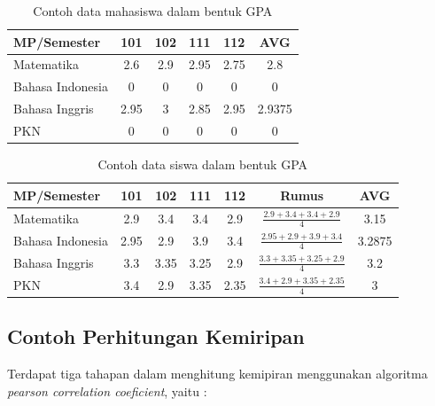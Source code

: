 \begin{table}[H]
    \centering
    \renewcommand{\arraystretch}{1.5}
    \begin{tabular}{|l|c|c|c|c|c|}
        \hline
        MP\slash Semester & 101 & 102 & 111 & 112 & AVG \\
        \hline 
        Matematika & 2.6 & 2.9 & 2.95 & 2.75 & 2.8 \\
        \hline 
        Bahasa Indonesia & 0 & 0 & 0 & 0 & 0 \\
        \hline 
        Bahasa Inggris & 2.95 & 3 & 2.85 & 2.95 & 2.9375 \\
        \hline 
        PKN & 0 & 0 & 0 & 0 & 0 \\
        \hline
    \end{tabular}
    \caption{Contoh data mahasiswa dalam bentuk GPA}
	\label{tab:data mahasswa}
\end{table}

\begin{table}[H]
    \centering
    \renewcommand{\arraystretch}{1.5}
    \begin{tabular}{|l|c|c|c|c|c|c|}
        \hline
        MP\slash Semester & 101 & 102 & 111 & 112 & Rumus & AVG \\
        \hline 
        Matematika & 2.9 & 3.4 & 3.4 & 2.9 & $\frac{2.9 + 3.4 +3.4 + 2.9}{4}$ & 3.15 \\
        \hline 
        Bahasa Indonesia & 2.95 & 2.9 & 3.9 & 3.4 & $\frac{2.95 + 2.9 + 3.9 + 3.4}{4}$ & 3.2875 \\
        \hline 
        Bahasa Inggris & 3.3 & 3.35 & 3.25 & 2.9 & $\frac{3.3 + 3.35 + 3.25 + 2.9}{4}$ & 3.2 \\
        \hline 
        PKN & 3.4 & 2.9 & 3.35 & 2.35 & $\frac{3.4 + 2.9 + 3.35 + 2.35}{4}$ & 3 \\
        \hline
    \end{tabular}
    \caption{Contoh data siswa dalam bentuk GPA}
	\label{tab:data siswa}
\end{table}


\subsection{Contoh Perhitungan Kemiripan}
\label{subsec:contoh perhitungan kemiripan}

Terdapat tiga tahapan dalam menghitung kemipiran menggunakan algoritma \textit{pearson correlation coeficient}, yaitu :

